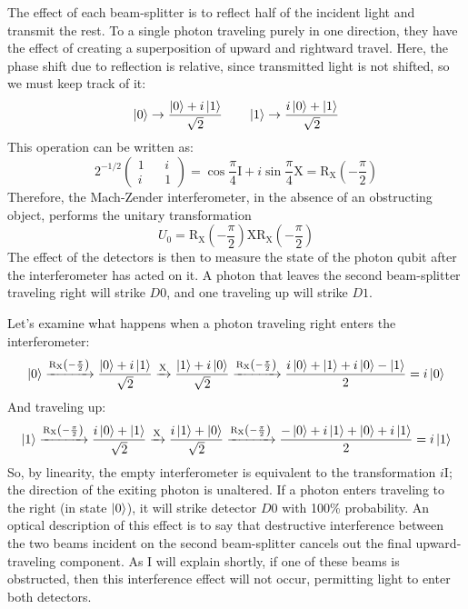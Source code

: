 \documentclass{article}
\newcommand{\I}{\text{I}}
\newcommand{\X}{\text{X}}
\newcommand{\RX}{\mathrm{R_X}}
\begin{document}
The effect of each beam-splitter is to reflect half of the incident light and transmit the rest. To a single photon traveling purely in one direction, they have the effect of creating a superposition of upward and rightward travel. Here, the phase shift due to reflection is relative, since transmitted light is not shifted, so we must keep track of it:
$$\ket 0 \to \frac{\ket 0 + i\ket 1}{\sqrt{2}} \qquad \ket 1 \to \frac{i\ket 0 + \ket 1}{\sqrt{2}}$$
This operation can be written as:
$$2^{-1/2}\begin{pmatrix}1 && i \\ i && 1\end{pmatrix} = \cos\frac{\pi}{4}\I + i\sin\frac{\pi}{4}\X = \RX\left(-\frac{\pi}{2}\right)$$
Therefore, the Mach-Zender interferometer, in the absence of an obstructing object, performs the unitary transformation
$$U_0 = \RX\left(-\frac{\pi}{2}\right)\X\RX\left(-\frac{\pi}{2}\right)$$
The effect of the detectors is then to measure the state of the photon qubit after the interferometer has acted on it. A photon that leaves the second beam-splitter traveling right will strike $D0$, and one traveling up will strike $D1$.

Let's examine what happens when a photon traveling right enters the interferometer:
\begin{equation} \label{eq:seq_0}
\ket 0 \xrightarrow{\RX\left(-\frac{\pi}{2}\right)} \frac{\ket 0 + i\ket 1}{\sqrt{2}} \xrightarrow{\X} \frac{\ket 1 + i\ket 0}{\sqrt{2}} \xrightarrow{\RX\left(-\frac{\pi}{2}\right)} \frac{i\ket 0 + \ket 1 + i\ket 0 - \ket 1}{2} = i\ket 0
\end{equation}
And traveling up:
\begin{equation} \label{eq:seq_1}
\ket 1 \xrightarrow{\RX\left(-\frac{\pi}{2}\right)} \frac{i\ket 0 + \ket 1}{\sqrt{2}} \xrightarrow{\X} \frac{i\ket 1 + \ket 0}{\sqrt{2}} \xrightarrow{\RX\left(-\frac{\pi}{2}\right)} \frac{-\ket 0 + i\ket 1 + \ket 0 + i\ket 1}{2} = i\ket 1
\end{equation}
So, by linearity, the empty interferometer is equivalent to the transformation $i\I$; the direction of the exiting photon is unaltered. If a photon enters traveling to the right (in state $\ket 0$), it will strike detector $D0$ with 100\% probability. An optical description of this effect is to say that destructive interference between the two beams incident on the second beam-splitter cancels out the final upward-traveling component. As I will explain shortly, if one of these beams is obstructed, then this interference effect will not occur, permitting light to enter both detectors.
\end{document}
